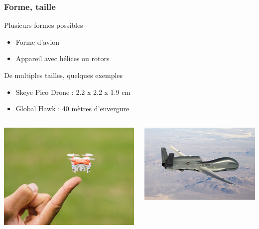 \documentclass{beamer}
\begin{document}
\begin{frame}
  \frametitle{Forme, taille}
  \begin{block}{Plusieurs formes possibles}
    \begin{itemize}
      \item Forme d'avion
      \item Appareil avec hélices ou rotors
    \end{itemize}
  \end{block}
  \begin{block}{De multiples tailles, quelques exemples}
    \begin{itemize}
      \item Skeye Pico Drone : 2.2 x 2.2 x 1.9 cm
      \item Global Hawk : 40 mètres d'envergure
    \end{itemize}
  \end{block}
  \begin{columns}
    \begin{column}{.5\textwidth}
      \includegraphics[width=\textwidth]{../Images/Skeye_Pico.jpg}
    \end{column}
    \begin{column}{.5\textwidth}
      \includegraphics[width=\textwidth]{../Images/global_hawk.jpg}
    \end{column}
  \end{columns}
\end{frame}
\end{document}
